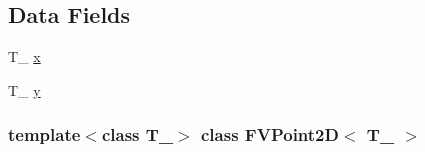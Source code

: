 \subsection*{Data Fields}
\begin{DoxyCompactItemize}
\item 
T\_\- \hyperlink{classFVPoint2D_a4333b1040efe8cd32f7c76bfc2269e0d}{x}
\item 
T\_\- \hyperlink{classFVPoint2D_ab4943c75e718fe503722ac7d26c746a6}{y}
\end{DoxyCompactItemize}
\subsubsection*{template$<$class T\_\-$>$ class FVPoint2D$<$ T\_\- $>$}



